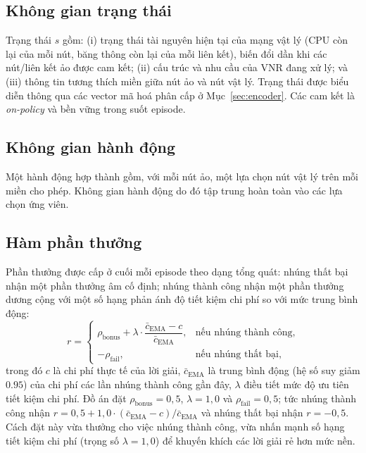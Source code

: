 \documentclass[../DoAn.tex]{subfiles}
\begin{document}
\subsection{Không gian trạng thái}
\label{subsec:env-state}

Trạng thái $s$ gồm: (i) trạng thái tài nguyên hiện tại của mạng vật lý (CPU còn lại của mỗi nút, băng thông còn lại của mỗi liên kết), biến đổi dần khi các nút/liên kết ảo được cam kết; (ii) cấu trúc và nhu cầu của VNR đang xử lý; và (iii) thông tin tương thích miền giữa nút ảo và nút vật lý. Trạng thái được biểu diễn thông qua các vector mã hoá phân cấp ở Mục~\ref{sec:encoder}. Các cam kết là \textit{on-policy} và bền vững trong suốt episode.

\subsection{Không gian hành động}
\label{subsec:env-action}

Một hành động hợp thành gồm, với mỗi nút ảo, một lựa chọn nút vật lý trên mỗi miền cho phép. Không gian hành động do đó tập trung hoàn toàn vào các lựa chọn ứng viên.

\subsection{Hàm phần thưởng}
\label{subsec:env-reward}

Phần thưởng được cấp ở cuối mỗi episode theo dạng tổng quát: nhúng thất bại nhận một phần thưởng âm cố định; nhúng thành công nhận một phần thưởng dương cộng với một số hạng phản ánh độ tiết kiệm chi phí so với mức trung bình động:
\begin{equation}
    r =
    \begin{cases}
        \rho_{\text{bonus}} + \lambda \cdot \dfrac{\bar{c}_{\text{EMA}} - c}{\bar{c}_{\text{EMA}}}, & \text{nếu nhúng thành công},\\[2mm]
        -\rho_{\text{fail}}, & \text{nếu nhúng thất bại},
    \end{cases}
    \label{eq:reward}
\end{equation}
trong đó $c$ là chi phí thực tế của lời giải, $\bar{c}_{\text{EMA}}$ là trung bình động (hệ số suy giảm $0.95$) của chi phí các lần nhúng thành công gần đây, $\lambda$ điều tiết mức độ ưu tiên tiết kiệm chi phí. Đồ án đặt $\rho_{\text{bonus}}=0{,}5$, $\lambda=1{,}0$ và $\rho_{\text{fail}}=0{,}5$; tức nhúng thành công nhận $r = 0{,}5 + 1{,}0\cdot(\bar{c}_{\text{EMA}}-c)/\bar{c}_{\text{EMA}}$ và nhúng thất bại nhận $r = -0{,}5$. Cách đặt này vừa thưởng cho việc nhúng thành công, vừa nhấn mạnh số hạng tiết kiệm chi phí (trọng số $\lambda=1{,}0$) để khuyến khích các lời giải rẻ hơn mức nền.
\end{document}
